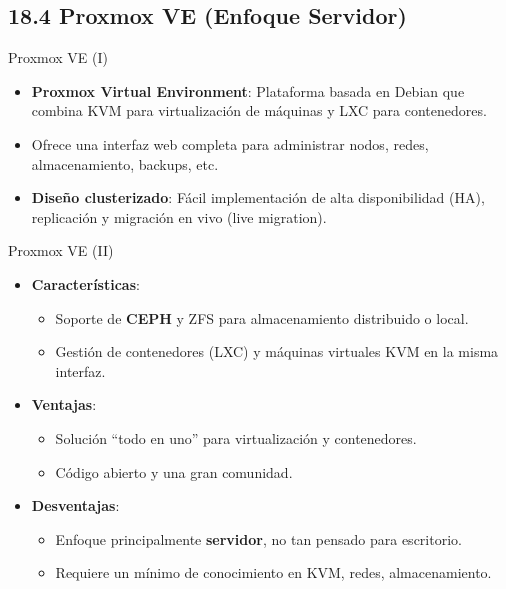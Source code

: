 \documentclass{beamer}
\begin{document}
\subsection{18.4 Proxmox VE (Enfoque Servidor)}
\begin{frame}{Proxmox VE (I)}
	\begin{itemize}
		\item \textbf{Proxmox Virtual Environment}: Plataforma basada en Debian que combina KVM para virtualización de máquinas y LXC para contenedores.
		\item Ofrece una interfaz web completa para administrar nodos, redes, almacenamiento, backups, etc.
		\item \textbf{Diseño clusterizado}: Fácil implementación de alta disponibilidad (HA), replicación y migración en vivo (live migration).
	\end{itemize}
\end{frame}

\begin{frame}{Proxmox VE (II)}
	\begin{itemize}
		\item \textbf{Características}:
			\begin{itemize}
				\item Soporte de \textbf{CEPH} y ZFS para almacenamiento distribuido o local.
				\item Gestión de contenedores (LXC) y máquinas virtuales KVM en la misma interfaz.
			\end{itemize}
		\item \textbf{Ventajas}:
			\begin{itemize}
				\item Solución “todo en uno” para virtualización y contenedores.
				\item Código abierto y una gran comunidad.
			\end{itemize}
		\item \textbf{Desventajas}:
			\begin{itemize}
				\item Enfoque principalmente \textbf{servidor}, no tan pensado para escritorio.
				\item Requiere un mínimo de conocimiento en KVM, redes, almacenamiento.
			\end{itemize}
	\end{itemize}
\end{frame}

\end{document}
